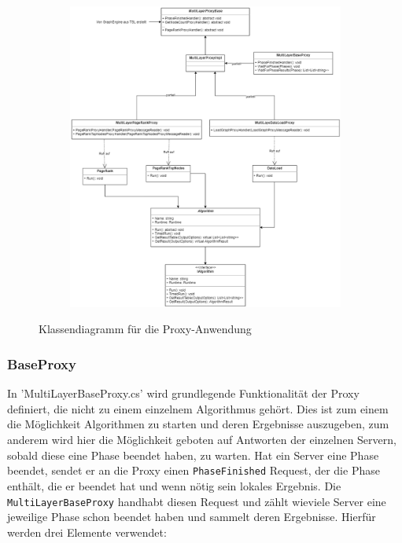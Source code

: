 \begin{figure}
  \centering
  \begin{subfigure}[b]{1.0\textwidth}
    \includegraphics[width=1.0\linewidth]{img/Klassendiagramm-Proxy.png}
  \end{subfigure}
  \caption{Klassendiagramm für die Proxy-Anwendung}
  \label{proxyClass}
\end{figure}


\subsubsection{BaseProxy}

In 'MultiLayerBaseProxy.cs' wird grundlegende Funktionalität der Proxy definiert, die nicht zu einem einzelnem Algorithmus gehört. Dies ist zum einem die Möglichkeit Algorithmen zu starten und deren Ergebnisse auszugeben, zum anderem wird hier die Möglichkeit geboten auf Antworten der einzelnen Servern, sobald diese eine Phase beendet haben, zu warten.
Hat ein Server eine Phase beendet, sendet er an die Proxy einen \verb|PhaseFinished| Request, der die Phase enthält, die er beendet hat und wenn nötig sein lokales Ergebnis. Die \verb|MultiLayerBaseProxy| handhabt diesen Request und zählt wieviele Server eine jeweilige Phase schon beendet haben und sammelt deren Ergebnisse. Hierfür werden drei Elemente verwendet:

